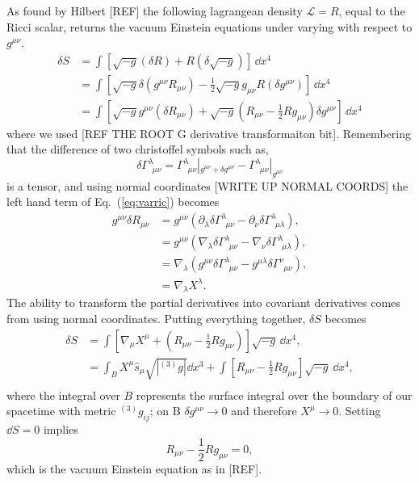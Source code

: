 As found by Hilbert [REF] the following lagrangean density $\mathcal{L}=R$, equal to the Ricci scalar, returns the vacuum Einstein equations under varying with respect to $g^{\mu\nu}$.
\begin{align}
\delta S &= \int \left[\sqrt{-g} (\delta R) + R (\delta \sqrt{-g})\right]\,\dd x^4 \\
&= \int \left[\sqrt{-g} \delta(g^{\mu\nu}R_{\mu\nu}) -\frac{1}{2} \sqrt{-g} g_{\mu\nu}R (\delta g^{\mu\nu})\right]\,\dd x^4 \\
&= \int \left[\sqrt{-g}g^{\mu\nu}(\delta R_{\mu\nu}) + \sqrt{-g}\left(R_{\mu\nu}-\frac{1}{2}R g_{\mu\nu} \right)\delta g^{\mu\nu}\right]\,\dd x^4 \label{eq:varric}
\end{align}  
where we used [REF THE ROOT G derivative transformaiton bit]. Remembering that the difference of two christoffel symbols such as,
\begin{equation}
\delta \Gamma^{\lambda}_{\,\,\,\mu\nu} = \Gamma^{\lambda}_{\,\,\,\mu\nu}|_{g^{\mu\nu}+\delta g^{\mu\nu}} - \Gamma^{\lambda}_{\,\,\,\mu\nu}|_{g^{\mu\nu}}
\end{equation} 
is a tensor, and using normal coordinates [WRITE UP NORMAL COORDS] the left hand term of Eq.~(\ref{eq:varric}) becomes
\begin{align}
g^{\mu\nu} \delta R_{\mu\nu} &= g^{\mu\nu}\left( \partial_\lambda \delta\Gamma^{\lambda}_{\,\,\,\mu\nu} - \partial_\nu \delta\Gamma^{\lambda}_{\,\,\,\mu\lambda} \right), \\
&= g^{\mu\nu}\left( \nabla_\lambda \delta\Gamma^{\lambda}_{\,\,\,\mu\nu} - \nabla_\nu \delta\Gamma^{\lambda}_{\,\,\,\mu\lambda} \right), \\
&= \nabla_\lambda \left( g^{\mu\nu} \delta\Gamma^{\lambda}_{\,\,\,\mu\nu} - g^{\mu\lambda} \delta\Gamma^{\nu}_{\,\,\,\mu\nu} \right), \\
&=\nabla_\lambda X^\lambda.
\end{align}
The ability to transform the partial derivatives into covariant derivatives comes from using normal coordinates. Putting everything together, $\delta S$ becomes
\begin{align}
\delta S &= \int \left[ \nabla_\mu X^\mu + \left( R_{\mu\nu}-\frac{1}{2}Rg_{\mu\nu}\right)\right]\sqrt{-g}\,\dd x^4, \\
&= \int_B X^\mu \hat{s}_\mu \sqrt{|{}^{(3)}g|}\dd x^3 + \int \left[  R_{\mu\nu}-\frac{1}{2}Rg_{\mu\nu}\right]\sqrt{-g}\,\dd x^4, \\
\end{align}
where the integral over $B$ represents the surface integral over the boundary of our spacetime with metric ${}^{(3)}g_{ij}$; on B $\delta g^{\mu\nu}\rightarrow 0 $ and therefore $X^\mu \rightarrow 0$. Setting $\dd S =0$ implies
\begin{equation}
R_{\mu\nu}-\frac{1}{2}Rg_{\mu\nu}=0,
\end{equation} 
which is the vacuum Einstein equation as in [REF].

